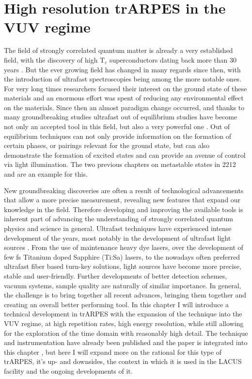 \chapter{High resolution trARPES in the VUV regime}

The field of strongly correlated quantum matter is already a very established field, with the discovery of high T$_c$ superconductors dating back more than 30 years \cite{anderson_resonating_1987}.
But the ever growing field has changed in many regards since then, with the introduction of ultrafast spectroscopies being among the more notable ones.
For very long times researchers focused their interest on the ground state of these materials and an enormous effort was spent of reducing any environmental effect on the materials.
Since then an almost paradigm change occurred, and thanks to many groundbreaking studies \cite{eesley_relaxation_1990, han_femtosecond_1990, giannetti_revealing_2011, smallwood_tracking_2012} ultrafast out of equilibrium studies have become not only an accepted tool in this field, but also a very powerful one \cite{orenstein_ultrafast_2012, maiuri_ultrafast_2020, boschini_time-resolved_2024, giannetti_ultrafast_2016, lloyd-hughes_2021_2021}.
Out of equilibrium techniques can not only provide information on the formation of certain phases, or pairings relevant for the ground state, but can also demonstrate the formation of excited states and can provide an avenue of control via light illumination.
The two previous chapters on metastable states in 2212 and  are an example for this.

New groundbreaking discoveries are often a result of technological advancements that allow a more precise measurement, revealing new features that expand our knowledge in the field.
Therefore developing and improving the available tools is inherent part of advancing the understanding of strongly correlated quantum physics and science in general.
Ultrafast techniques have experienced intense development of the years, most notably in the development of ultrafast light sources \cite{keller_recent_2003}.
From the use of maintenance heavy dye lasers, over the development of few \unit{\femto\second} Titanium doped Sapphire (Ti:Sa) lasers, to the nowadays often preferred ultrafast fiber based turn-key solutions, light sources have become more precise, stable and user-friendly.
Further developments of better detection schemes, vacuum systems, sample quality are naturally of similar importance.
In general, the challenge is to bring together all recent advances, bringing them together and creating an overall better performing tool.
In this chapter I will introduce a technical development in trARPES with the expansion of the technique into the VUV regime, at high repetition rates, high energy resolution, while still allowing for the exploration of the time domain with reasonably high detail.
The technique and instrumentation have already been published and the paper is integrated into this chapter \cite{hellbruck_high-resolution_2024}, but here I will expand more on the rational for this type of trARPES, it's up- and downsides, the context in which it is used in the LACUS facility and the ongoing developments of it.

